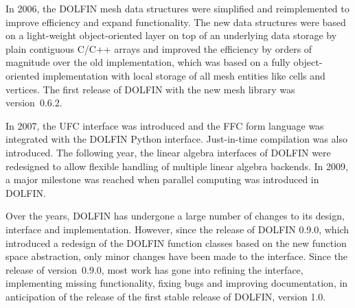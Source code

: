 In 2006, the DOLFIN mesh data structures were simplified and
reimplemented to improve efficiency and expand functionality. The new
data structures were based on a light-weight object-oriented layer on
top of an underlying data storage by plain contiguous C/C++ arrays and
improved the efficiency by orders of magnitude over the old
implementation, which was based on a fully object-oriented
implementation with local storage of all mesh entities like cells and
vertices. The first release of DOLFIN with the new mesh library was
version~0.6.2.

In 2007, the UFC interface was introduced and the FFC form language was
integrated with the DOLFIN Python interface. Just-in-time compilation
was also introduced. The following year, the linear algebra interfaces
of DOLFIN were redesigned to allow flexible handling of multiple linear
algebra backends. In 2009, a major milestone was reached when parallel
computing was introduced in DOLFIN.

Over the years, DOLFIN has undergone a large number of changes to its
design, interface and implementation. However, since the release of
DOLFIN 0.9.0, which introduced a redesign of the DOLFIN function classes
based on the new function space abstraction, only minor changes have been
made to the interface. Since the release of version~0.9.0, most work has
gone into refining the interface, implementing missing functionality,
fixing bugs and improving documentation, in anticipation of the release
of the first stable release of DOLFIN, version 1.0.

